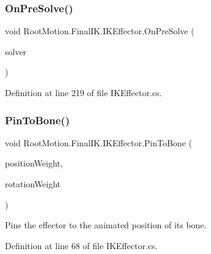 \subsubsection{\texorpdfstring{On\+Pre\+Solve()}{OnPreSolve()}}
{\footnotesize\ttfamily void Root\+Motion.\+Final\+I\+K.\+I\+K\+Effector.\+On\+Pre\+Solve (\begin{DoxyParamCaption}\item[{\mbox{\hyperlink{class_root_motion_1_1_final_i_k_1_1_i_k_solver_full_body}{I\+K\+Solver\+Full\+Body}}}]{solver }\end{DoxyParamCaption})}



Definition at line 219 of file I\+K\+Effector.\+cs.

\mbox{\label{class_root_motion_1_1_final_i_k_1_1_i_k_effector_a3ebaa0d3b41215faeb0a1637e8c16afc}} 
\subsubsection{\texorpdfstring{Pin\+To\+Bone()}{PinToBone()}}
{\footnotesize\ttfamily void Root\+Motion.\+Final\+I\+K.\+I\+K\+Effector.\+Pin\+To\+Bone (\begin{DoxyParamCaption}\item[{float}]{position\+Weight,  }\item[{float}]{rotation\+Weight }\end{DoxyParamCaption})}



Pins the effector to the animated position of it\textquotesingle{}s bone. 



Definition at line 68 of file I\+K\+Effector.\+cs.

\mbox{\label{class_root_motion_1_1_final_i_k_1_1_i_k_effector_a93ab0521ce49bc589267dbfb6ffb263c}} 
